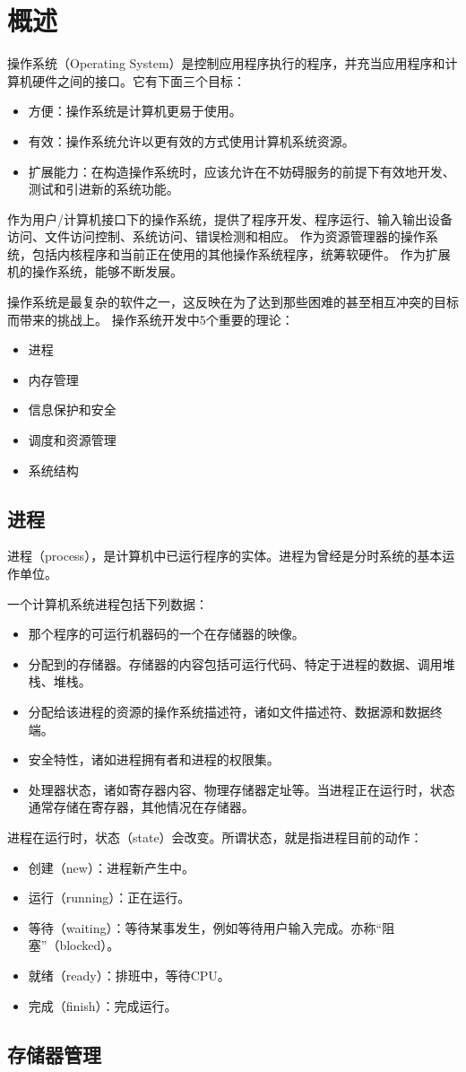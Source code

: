 \section{概述}

操作系统（Operating System）是控制应用程序执行的程序，并充当应用程序和计算机硬件之间的接口。它有下面三个目标：
\begin{itemize}
  \item 方便：操作系统是计算机更易于使用。
  \item 有效：操作系统允许以更有效的方式使用计算机系统资源。
  \item 扩展能力：在构造操作系统时，应该允许在不妨碍服务的前提下有效地开发、测试和引进新的系统功能。
\end{itemize}

作为用户/计算机接口下的操作系统，提供了程序开发、程序运行、输入输出设备访问、文件访问控制、系统访问、错误检测和相应。
作为资源管理器的操作系统，包括内核程序和当前正在使用的其他操作系统程序，统筹软硬件。
作为扩展机的操作系统，能够不断发展。

操作系统是最复杂的软件之一，这反映在为了达到那些困难的甚至相互冲突的目标而带来的挑战上。
操作系统开发中5个重要的理论\cite{denn80a}：
\begin{itemize}
  \item 进程
  \item 内存管理
  \item 信息保护和安全
  \item 调度和资源管理
  \item 系统结构
\end{itemize}

\subsection{进程}

进程（process），是计算机中已运行程序的实体。进程为曾经是分时系统的基本运作单位。

一个计算机系统进程包括下列数据：
\begin{itemize}
  \item 那个程序的可运行机器码的一个在存储器的映像。
  \item 分配到的存储器。存储器的内容包括可运行代码、特定于进程的数据、调用堆栈、堆栈。
  \item 分配给该进程的资源的操作系统描述符，诸如文件描述符、数据源和数据终端。
  \item 安全特性，诸如进程拥有者和进程的权限集。
  \item 处理器状态，诸如寄存器内容、物理存储器定址等。当进程正在运行时，状态通常存储在寄存器，其他情况在存储器。
\end{itemize}

进程在运行时，状态（state）会改变。所谓状态，就是指进程目前的动作：
\begin{itemize}
  \item 创建（new）：进程新产生中。
  \item 运行（running）：正在运行。
  \item 等待（waiting）：等待某事发生，例如等待用户输入完成。亦称“阻塞”（blocked）。
  \item 就绪（ready）：排班中，等待CPU。
  \item 完成（finish）：完成运行。
\end{itemize}

\subsection{存储器管理}
